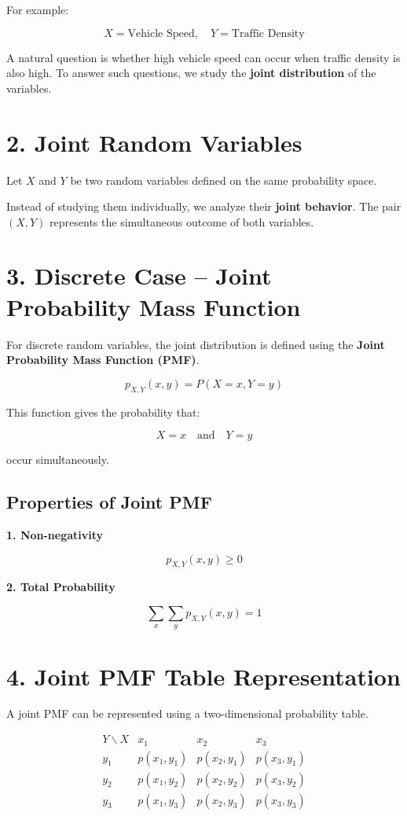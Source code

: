 \documentclass[11pt]{article}
\begin{document}
For example:

\[
X = \text{Vehicle Speed}, \quad Y = \text{Traffic Density}
\]

A natural question is whether high vehicle speed can occur when traffic density is also high.  
To answer such questions, we study the \textbf{joint distribution} of the variables.

\section*{2. Joint Random Variables}

Let $X$ and $Y$ be two random variables defined on the same probability space.

Instead of studying them individually, we analyze their \textbf{joint behavior}.  
The pair $(X,Y)$ represents the simultaneous outcome of both variables.

\section*{3. Discrete Case – Joint Probability Mass Function}

For discrete random variables, the joint distribution is defined using the \textbf{Joint Probability Mass Function (PMF)}.

\[
p_{X,Y}(x,y) = P(X = x, Y = y)
\]

This function gives the probability that:

\[
X = x \quad \text{and} \quad Y = y
\]

occur simultaneously.

\subsection*{Properties of Joint PMF}

\textbf{1. Non-negativity}

\[
p_{X,Y}(x,y) \geq 0
\]

\textbf{2. Total Probability}

\[
\sum_x \sum_y p_{X,Y}(x,y) = 1
\]

\section*{4. Joint PMF Table Representation}

A joint PMF can be represented using a two-dimensional probability table.

\[
\begin{array}{c|ccc}
Y \backslash X & x_1 & x_2 & x_3 \\
\hline
y_1 & p(x_1,y_1) & p(x_2,y_1) & p(x_3,y_1) \\
y_2 & p(x_1,y_2) & p(x_2,y_2) & p(x_3,y_2) \\
y_3 & p(x_1,y_3) & p(x_2,y_3) & p(x_3,y_3)
\end{array}
\]
\end{document}
